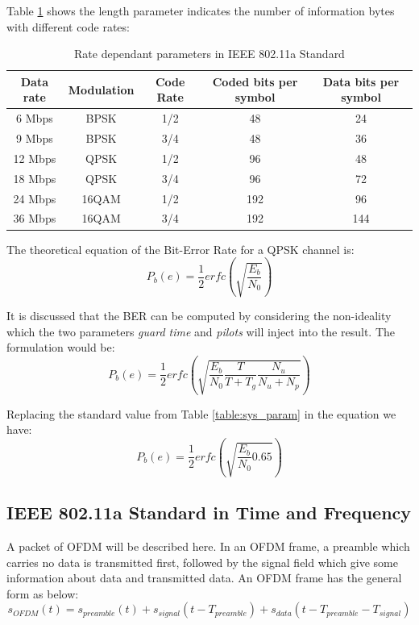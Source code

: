 Table \ref{table:code_vs_rate} shows the length parameter indicates the number of information bytes with different code rates:

\begin{table}
\centering
\vspace{0.5cm}
\begin{tabular}{c|c|c|c|c}
Data rate&Modulation&Code Rate&Coded bits per symbol&Data bits per symbol\\ \hline
6 Mbps&BPSK&1/2&48&24\\
9 Mbps&BPSK&3/4&48&36\\
12 Mbps&QPSK&1/2&96&48\\
18 Mbps&QPSK&3/4&96&72\\
24 Mbps&16QAM&1/2&192&96\\
36 Mbps&16QAM&3/4&192&144\\
\end{tabular}
\caption{Rate dependant parameters in IEEE 802.11a Standard}
\label{table:code_vs_rate}
\end{table}

The theoretical equation of the Bit-Error Rate for a QPSK channel is:\\

\begin{equation} \label{theo_ber}
P_{b}(e)= \dfrac{1}{2}erfc(\sqrt{\dfrac{E_{b}}{N_{0}}})
\end{equation}

It is discussed that the BER can be computed by considering the non-ideality which the two parameters \textit{guard time} and \textit{pilots} will inject into the result. The formulation would be:\\

\begin{equation} \label{theo_ber_guard_pilot}
P_{b}(e)= \dfrac{1}{2}erfc(\sqrt{\dfrac{E_{b}}{N_{0}}\dfrac{T}{T+T_{g}}\dfrac{N_{u}}{N_{u}+N_{p}}})
\end{equation}

Replacing the standard value from Table \ref{table:sys_param} in the equation we have:\\

\begin{equation} \label{theo_ber_ieee}
P_{b}(e)= \dfrac{1}{2}erfc(\sqrt{\dfrac{E_{b}}{N_{0}}0.65})
\end{equation}

\subsection{IEEE 802.11a Standard in Time and Frequency}
\label{section:ieee_standard}
A packet of OFDM will be described here. In an OFDM frame, a preamble which carries no data is transmitted first, followed by the signal field which give some information about data and transmitted data. An OFDM frame has the general form as below:
\begin{equation} \label{sym_ofdm}
s_{OFDM}(t)= s_{preamble}(t)+ s_{signal}(t- T_{preamble})+ s_{data}(t- T_{preamble}- T_{signal})
\end{equation}

